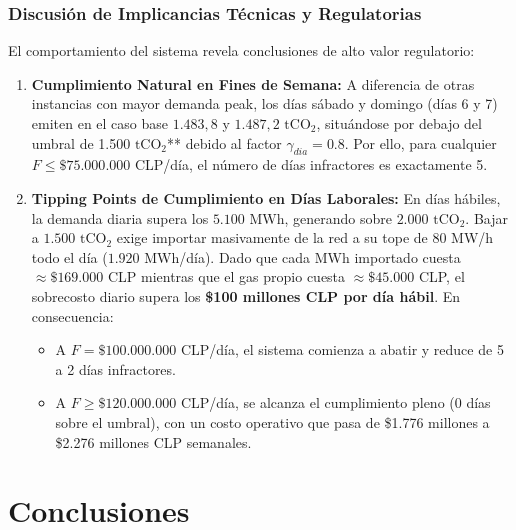 \documentclass[10pt,letterpaper]{article}
\begin{document}
\subsubsection*{Discusión de Implicancias Técnicas y Regulatorias}
El comportamiento del sistema revela conclusiones de alto valor regulatorio:
\begin{enumerate}
    \item \textbf{Cumplimiento Natural en Fines de Semana:} A diferencia de otras instancias con mayor demanda peak, los días sábado y domingo (días 6 y 7) emiten en el caso base $1.483,8$ y $1.487,2\text{ tCO}_2$, situándose por debajo del umbral de 1.500 $\text{tCO}_2$** debido al factor $\gamma_{dia} = 0.8$. Por ello, para cualquier $F \le \$75.000.000$ CLP/día, el número de días infractores es exactamente 5.
    \item \textbf{Tipping Points de Cumplimiento en Días Laborales:} En días hábiles, la demanda diaria supera los $5.100$ MWh, generando sobre $2.000 \text{ tCO}_2$. Bajar a $1.500 \text{ tCO}_2$ exige importar masivamente de la red a su tope de 80 MW/h todo el día ($1.920$ MWh/día). Dado que cada MWh importado cuesta $\approx \$169.000$ CLP mientras que el gas propio cuesta $\approx \$45.000$ CLP, el sobrecosto diario supera los \textbf{\$100 millones CLP por día hábil}. En consecuencia:
    \begin{itemize}
        \item A $F = \$100.000.000$ CLP/día, el sistema comienza a abatir y reduce de 5 a 2 días infractores.
        \item A $F \ge \$120.000.000$ CLP/día, se alcanza el cumplimiento pleno (0 días sobre el umbral), con un costo operativo que pasa de \$1.776 millones a \$2.276 millones CLP semanales.
    \end{itemize}
\end{enumerate}

\section{Conclusiones}
\label{sec:conclusiones}
\end{document}
